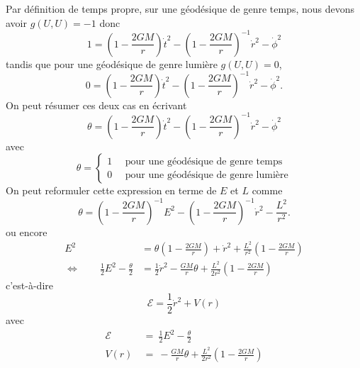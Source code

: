 \documentclass[a4paper,11pt]{report}
\begin{document}
            Par définition de temps propre, sur une géodésique de genre temps, nous devons avoir $g(U,U)=-1$ donc
            \begin{equation}
                1 = \left( 1-\frac{2GM}{r} \right)\dot{t}^2-\left( 1-\frac{2GM}{r} \right)^{-1}\dot{r}^2-\dot{\phi}^2
            \end{equation}
            tandis que pour une géodésique de genre lumière $g(U,U)=0$,
            \begin{equation}
                0 = \left( 1-\frac{2GM}{r} \right)\dot{t}^2-\left( 1-\frac{2GM}{r} \right)^{-1}\dot{r}^2-\dot{\phi}^2.
            \end{equation}
            On peut résumer ces deux cas en écrivant
            \begin{equation}
                \theta = \left( 1-\frac{2GM}{r} \right)\dot{t}^2-\left( 1-\frac{2GM}{r} \right)^{-1}\dot{r}^2-\dot{\phi}^2
            \end{equation}
            avec 
            \begin{equation}
                \theta =
                \begin{cases}
                    1 \quad\text{ pour une géodésique de genre temps}\\
                    0 \quad\text{ pour une géodésique de genre lumière}
                \end{cases}
            \end{equation}
            On peut reformuler cette expression en terme de $E$ et $L$ comme
            \begin{equation}
                \theta = \left( 1-\frac{2GM}{r} \right)^{-1} E^2-\left( 1-\frac{2GM}{r} \right)^{-1}\dot{r}^2-\frac{L^2}{r^2}.
            \end{equation}
            ou encore
            \begin{align}
                E^2 &= \theta \left( 1-\frac{2GM}{r} \right)+\dot{r}^2+\frac{L^2}{r^2}\left( 1-\frac{2GM}{r} \right)\\
                \Leftrightarrow\qquad \frac{1}{2}E^2-\frac{\theta}{2} &= \frac{1}{2}\dot{r}^2-\frac{GM}{r}\theta+\frac{L^2}{2r^2}\left( 1-\frac{2GM}{r} \right)
            \end{align}
            c'est-à-dire
            \begin{equation}
                \mathscr{E} = \frac{1}{2}\dot{r}^2 + V(r)
            \end{equation}
            avec 
            \begin{align}
                \mathscr{E} &~\hat{=}~ \frac{1}{2}E^2-\frac{\theta}{2}\\
                V(r) &~\hat{=}~ -\frac{GM}{r}\theta+\frac{L^2}{2r^2}\left( 1-\frac{2GM}{r} \right)
            \end{align}
\end{document}
